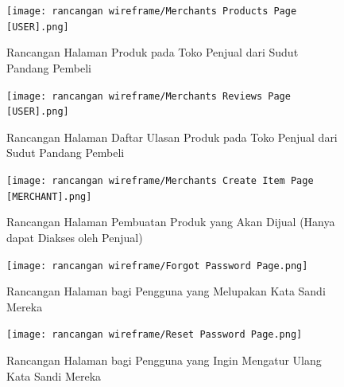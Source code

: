 \documentclass[a4paper]{article}
\begin{document}
\begin{enumerate}
    \begin{figure}[h]
        \centering
        \texttt{[image: rancangan wireframe/Merchants Products Page [USER].png]}
        \caption{Rancangan Halaman Produk pada Toko Penjual dari Sudut Pandang Pembeli}
    \end{figure}
    \newpage
    \begin{figure}[h]
        \centering
        \texttt{[image: rancangan wireframe/Merchants Reviews Page [USER].png]}
        \caption{Rancangan Halaman Daftar Ulasan Produk pada Toko Penjual dari Sudut Pandang Pembeli}
    \end{figure}

    \begin{figure}[h]
        \centering
        \texttt{[image: rancangan wireframe/Merchants Create Item Page [MERCHANT].png]}
        \caption{Rancangan Halaman Pembuatan Produk yang Akan Dijual (Hanya dapat Diakses oleh Penjual)}
    \end{figure}
    \newpage
    \begin{figure}[h]
        \centering
        \texttt{[image: rancangan wireframe/Forgot Password Page.png]}
        \caption{Rancangan Halaman bagi Pengguna yang Melupakan Kata Sandi Mereka}
    \end{figure}

    \begin{figure}[h]
        \centering
        \texttt{[image: rancangan wireframe/Reset Password Page.png]}
        \caption{Rancangan Halaman bagi Pengguna yang Ingin Mengatur Ulang Kata Sandi Mereka}
    \end{figure}
    

\end{enumerate}
\end{document}
